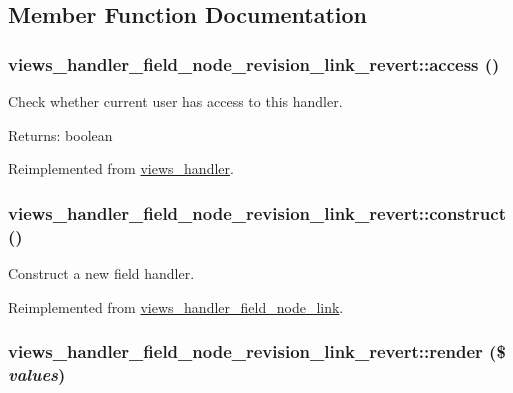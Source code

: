 \subsection{Member Function Documentation}
\hypertarget{classviews__handler__field__node__revision__link__revert_6cb6e683478e55b9e3e64602dbc8886d}{
\subsubsection[{access}]{\setlength{\rightskip}{0pt plus 5cm}views\_\-handler\_\-field\_\-node\_\-revision\_\-link\_\-revert::access ()}}
\label{classviews__handler__field__node__revision__link__revert_6cb6e683478e55b9e3e64602dbc8886d}


Check whether current user has access to this handler.

\begin{Desc}
\item[Returns:]boolean \end{Desc}


Reimplemented from \hyperlink{classviews__handler_3f2fbfe1e0849d06ae77149412b821f6}{views\_\-handler}.\hypertarget{classviews__handler__field__node__revision__link__revert_51850ebf69c6cdbc043378a538931fc0}{
\subsubsection[{construct}]{\setlength{\rightskip}{0pt plus 5cm}views\_\-handler\_\-field\_\-node\_\-revision\_\-link\_\-revert::construct ()}}
\label{classviews__handler__field__node__revision__link__revert_51850ebf69c6cdbc043378a538931fc0}


Construct a new field handler. 

Reimplemented from \hyperlink{classviews__handler__field__node__link_c3f643ba7dd0435fc03c7bf477907484}{views\_\-handler\_\-field\_\-node\_\-link}.\hypertarget{classviews__handler__field__node__revision__link__revert_eb4c6a3ba1544e14492bd1fec4ee4e91}{
\subsubsection[{render}]{\setlength{\rightskip}{0pt plus 5cm}views\_\-handler\_\-field\_\-node\_\-revision\_\-link\_\-revert::render (\$ {\em values})}}
\label{classviews__handler__field__node__revision__link__revert_eb4c6a3ba1544e14492bd1fec4ee4e91}


